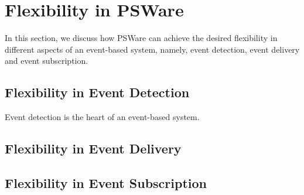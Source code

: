 \section{Flexibility in PSWare}
In this section, we discuss how PSWare can achieve the desired flexibility in different aspects of an event-based system, namely, event detection, event delivery and event subscription.

\subsection{Flexibility in Event Detection}
Event detection is the heart of an event-based system. 

\subsection{Flexibility in Event Delivery}

\subsection{Flexibility in Event Subscription}